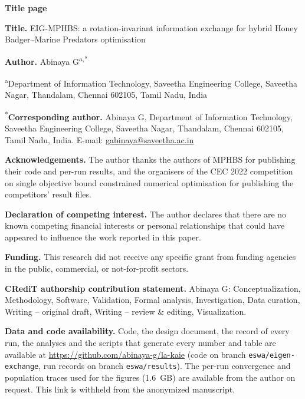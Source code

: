\documentclass[11pt]{article}
\begin{document}
{\large\bfseries Title page}

\textbf{Title.} EIG-MPHBS: a rotation-invariant information exchange for hybrid Honey Badger--Marine Predators
optimisation

\textbf{Author.} Abinaya G\textsuperscript{a,*}

\textsuperscript{a}Department of Information Technology, Saveetha Engineering College, Saveetha Nagar, Thandalam,
Chennai 602105, Tamil Nadu, India

\textsuperscript{*}\textbf{Corresponding author.} Abinaya G, Department of Information Technology, Saveetha
Engineering College, Saveetha Nagar, Thandalam, Chennai 602105, Tamil Nadu, India.
E-mail: \url{gabinaya@saveetha.ac.in}

\textbf{Acknowledgements.} The author thanks the authors of MPHBS for publishing their code and per-run results, and
the organisers of the CEC 2022 competition on single objective bound constrained numerical optimisation for publishing
the competitors' result files.

\textbf{Declaration of competing interest.} The author declares that there are no known competing financial interests
or personal relationships that could have appeared to influence the work reported in this paper.

\textbf{Funding.} This research did not receive any specific grant from funding agencies in the public, commercial, or
not-for-profit sectors.

\textbf{CRediT authorship contribution statement.} Abinaya G: Conceptualization, Methodology, Software, Validation,
Formal analysis, Investigation, Data curation, Writing -- original draft, Writing -- review \& editing, Visualization.

\textbf{Data and code availability.} Code, the design document, the record of every run, the analyses and the
scripts that generate every number and table are available at \url{https://github.com/abinaya-g/la-kaie} (code on
branch \texttt{eswa/eigen-exchange}, run records on branch \texttt{eswa/results}). The per-run convergence and
population traces used for the figures (1.6~GB) are available from the author on request. This link is withheld from
the anonymized manuscript.
\end{document}
